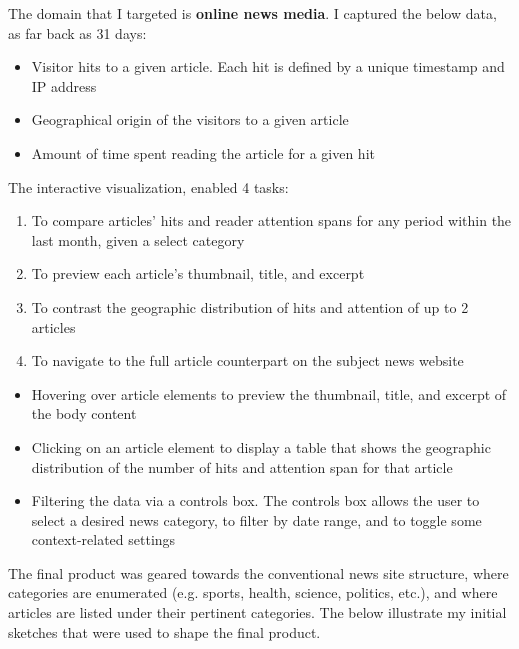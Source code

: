 \documentclass[12pt]{article}
\begin{document}
\noindent The domain that I targeted is \textbf{online news media}. I captured the below data, as far back as 31 days:
\begin{itemize}
\item Visitor hits to a given article. Each hit is defined by a unique timestamp and IP address
\item Geographical origin of the visitors to a given article
\item Amount of time spent reading the article for a given hit
\end{itemize}


\noindent The interactive visualization, enabled 4 tasks:
\begin{enumerate}
\item To compare articles' hits and reader attention spans for any period within the last month, given a select category
\item To preview each article's thumbnail, title, and excerpt
\item To contrast the geographic distribution of hits and attention of up to 2 articles
\item To navigate to the full article counterpart on the subject news website
\end{enumerate}

\begin{itemize}
\item Hovering over article elements to preview the thumbnail, title, and excerpt of the body content
\item Clicking on an article element to display a table that shows the geographic distribution of the number of hits and attention span for that article
\item Filtering the data via a controls box. The controls box allows the user to select a desired news category, to filter by date range, and to toggle some context-related settings 
\end{itemize}

The final product was geared towards the conventional news site structure, where categories are enumerated (e.g. sports, health, science, politics, etc.), and where articles are listed under their pertinent categories. The below illustrate my initial sketches that were used to shape the final product.\\
\end{document}
